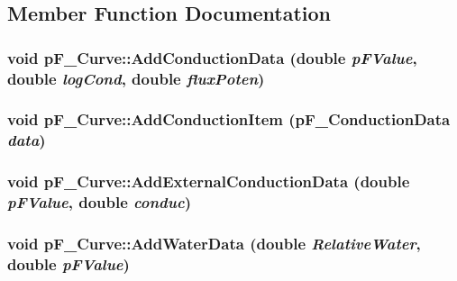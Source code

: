 \subsection{Member Function Documentation}
\hypertarget{classp_f___curve_a64d50a0166931ab3390514d037f20c04}{
\subsubsection[{AddConductionData}]{\setlength{\rightskip}{0pt plus 5cm}void pF\_\-Curve::AddConductionData (double {\em pFValue}, \/  double {\em logCond}, \/  double {\em fluxPoten})}}
\label{classp_f___curve_a64d50a0166931ab3390514d037f20c04}
\hypertarget{classp_f___curve_aade09d8adedcc05c408e8410364d9132}{
\subsubsection[{AddConductionItem}]{\setlength{\rightskip}{0pt plus 5cm}void pF\_\-Curve::AddConductionItem ({\bf pF\_\-ConductionData} {\em data})}}
\label{classp_f___curve_aade09d8adedcc05c408e8410364d9132}
\hypertarget{classp_f___curve_a85d921adde495b6e6bcb0ccab79739be}{
\subsubsection[{AddExternalConductionData}]{\setlength{\rightskip}{0pt plus 5cm}void pF\_\-Curve::AddExternalConductionData (double {\em pFValue}, \/  double {\em conduc})}}
\label{classp_f___curve_a85d921adde495b6e6bcb0ccab79739be}
\hypertarget{classp_f___curve_a32475e71de9e84e7e565d2d2244bf062}{
\subsubsection[{AddWaterData}]{\setlength{\rightskip}{0pt plus 5cm}void pF\_\-Curve::AddWaterData (double {\em RelativeWater}, \/  double {\em pFValue})}}

